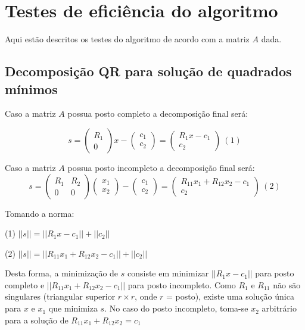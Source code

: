 \chapter{Testes de eficiência do algoritmo}
Aqui estão descritos os testes do algoritmo de acordo com a matriz $A$ dada.

\section{Decomposição QR para solução de quadrados mínimos}

Caso a matriz $A$ possua posto completo a decomposição final será:

\[ s =
\left(\begin{array}{c} R_1 \\ 0\end{array}\right) x- \left(\begin{array}{c} c_1 \\ c_2\end{array}\right) =  \left(\begin{array}{c} R_1 x - c_1 \\ c_2\end{array}\right) ~(1)
\]

Caso a matriz $A$ possua posto incompleto a decomposição final será:
\[ s =
\left(\begin{array}{cc} R_1 & R_2\\ 0&0\end{array}\right) \left(\begin{array}{c} x_1 \\ x_2\end{array}\right)- \left(\begin{array}{c} c_1 \\ c_2\end{array}\right) =  \left(\begin{array}{c} R_{11} x_1 + R_{12}x_2- c_1 \\ c_2\end{array}\right) ~(2)
\]

Tomando a norma:

 (1) $||s|| = || R_1x - c_1 || + ||c_2||$

 (2) $||s|| = ||R_{11}x_1 + R_{12}x_2 - c_1|| + ||c_2||$

Desta forma, a minimização de $s$ consiste em minimizar $|| R_1x - c_1 ||$ para posto 
completo e $||R_{11}x_1+R_{12}x_2 - c_1||$ para posto incompleto. Como $R_1$ e $R_{11}$ não são 
singulares (triangular superior $r \times r$, onde $r$ = posto), existe uma solução única para $x$ e $x_1$ que 
minimiza $s$. No caso do posto incompleto, toma-se $x_2$ arbitrário para a solução de $R_{11}x_1 + R_{12}x_2 = c_1$

